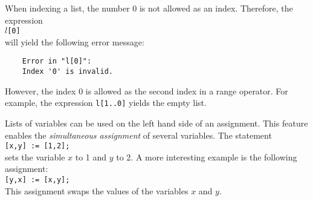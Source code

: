 When indexing a list, the number $0$ is not allowed as an index.  Therefore, the expression
\\[0.2cm]
\hspace*{1.3cm}
\texttt{$l$[0]}
\\[0.2cm]
will yield the following error message:
\begin{verbatim}
    Error in "l[0]":
    Index '0' is invalid.
\end{verbatim}
However, the index $0$ is allowed as the second index in a range operator.  For example, the expression
\texttt{l[1..0]}
yields the empty list.


Lists of variables can be used on the left hand side of an assignment.  This feature enables the
\emph{simultaneous assignment} of several variables.  The statement
\\[0.2cm]
\hspace*{1.3cm}
\texttt{[x,y] := [1,2];}
\\[0.2cm]
sets the variable $x$ to 1 and $y$ to 2.  A more interesting example is the following assignment:
\\[0.2cm]
\hspace*{1.3cm}
\texttt{[y,x] := [x,y];}
\\[0.2cm]
This assignment swaps the values of the variables $x$ and $y$.


